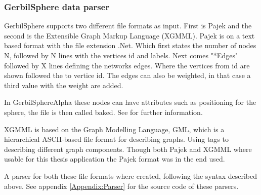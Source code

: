 \documentclass[a4paper,11pt]{kth-mag}
\begin{document}
\begin{appendices}
\subsubsection{GerbilSphere data parser}
GerbilSphere supports two different file formats as input. First is Pajek\cite{website:gephipajek} and the second is the Extensible Graph Markup Language (XGMML)\cite{website:xgmml}. Pajek is on a text based format with the file 
extension .Net. Which first states the number of nodes N, followed by N lines with the vertices id and labels. Next comes "*Edges" followed by X lines defining the networks edges. Where the vertices from id
are shown followed the to vertice id. The edges can also be weighted, in that case a third value with the weight are added. 

In GerbilSphereAlpha these nodes can have attributes such as positioning for the sphere, the file is then called baked. See \cite{Shelley20121016} for further information.

XGMML is based on the Graph Modelling Language, GML, which is a hierarchical ASCII-based file format for describing graphs. Using tags to describing different graph components.
Though both Pajek and XGMML where usable for this thesis application the Pajek format was in the end used.

A parser for both these file formats where created, following the syntax described above. See appendix \ref{Appendix:Parser} for the source code of these parsers.
\end{appendices}

\nocite{*}\\

\renewcommand{\bibname}{References}
%

\end{document}
